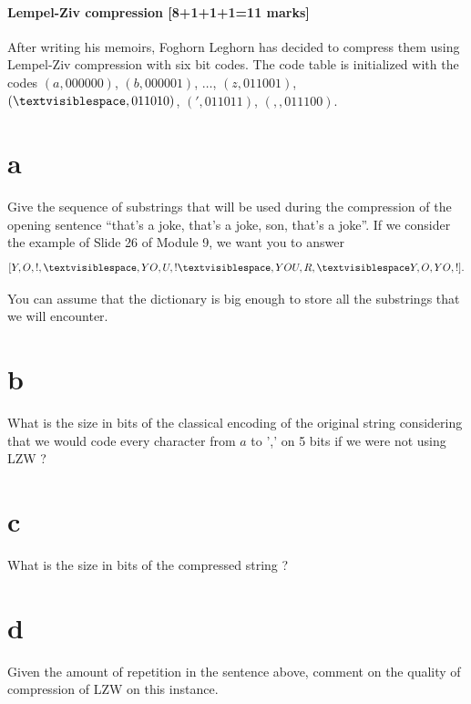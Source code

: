 \documentclass[12pt]{article}
\newcommand{\vs}{\textvisiblespace}
\begin{document}
\subsection{Lempel-Ziv compression [8+1+1+1=11 marks]}
After writing his memoirs, Foghorn Leghorn has decided to compress them
using Lempel-Ziv compression with six bit codes.
The code table is initialized with the codes
$(a,000000)$, $(b,000001)$, $\dots$, $(z,011001)$, $({\vs},011010)$,
$(',011011)$, $(, ,011100)$.
\begin{enumerate}
\part{a}Give the sequence of substrings that will be used during the compression
of the opening sentence ``that's a joke, that's a joke, son, that's a joke''.
If we consider the example of Slide 26 of Module 9, we want you to answer
$$[Y,O,!,{\vs},YO,U,!{\vs},YOU,R,{\vs}Y,O,YO,!].$$

You can assume that the dictionary is big enough to store
all the substrings that we will encounter.

\part{b} What is the size in bits of the classical encoding of the original string considering that we would code every character from $a$ to ',' on 5 bits if we were not using LZW  ?

\part{c} What is the size in bits of the compressed string ?

\part{d} Given the amount of repetition in the sentence above, comment on the quality of compression of LZW on this instance.

\end{enumerate}
\end{document}
